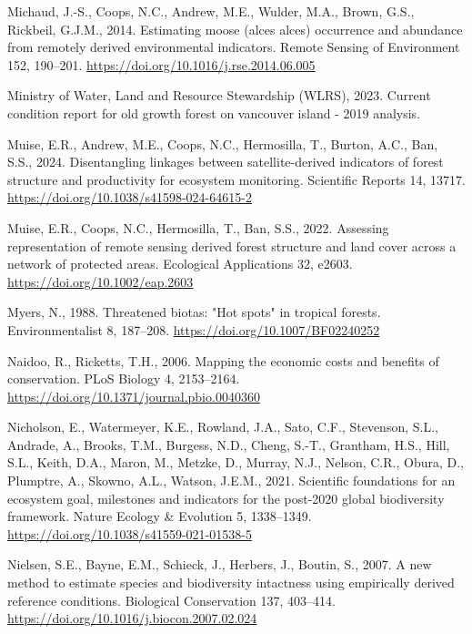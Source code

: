 \documentclass[
]{agujournal2019}
\newlength{\cslhangindent}
\newenvironment{CSLReferences}[2] %
 {\begin{list}{}{%
  \setlength{\itemindent}{0pt}
  \setlength{\leftmargin}{0pt}
  \setlength{\parsep}{0pt}
  \ifodd #1
   \setlength{\leftmargin}{\cslhangindent}
   \setlength{\itemindent}{-1\cslhangindent}
  \fi
  \setlength{\itemsep}{#2\baselineskip}}}
 {\end{list}}
\begin{document}
\begin{CSLReferences}{1}{0}
Michaud, J.-S., Coops, N.C., Andrew, M.E., Wulder, M.A., Brown, G.S.,
Rickbeil, G.J.M., 2014. Estimating moose (alces alces) occurrence and
abundance from remotely derived environmental indicators. Remote Sensing
of Environment 152, 190--201.
\url{https://doi.org/10.1016/j.rse.2014.06.005}

Ministry of Water, Land and Resource Stewardship (WLRS), 2023. Current
condition report for old growth forest on vancouver island - 2019
analysis.

Muise, E.R., Andrew, M.E., Coops, N.C., Hermosilla, T., Burton, A.C.,
Ban, S.S., 2024. Disentangling linkages between satellite-derived
indicators of forest structure and productivity for ecosystem
monitoring. Scientific Reports 14, 13717.
\url{https://doi.org/10.1038/s41598-024-64615-2}

Muise, E.R., Coops, N.C., Hermosilla, T., Ban, S.S., 2022. Assessing
representation of remote sensing derived forest structure and land cover
across a network of protected areas. Ecological Applications 32, e2603.
\url{https://doi.org/10.1002/eap.2603}

Myers, N., 1988. Threatened biotas: {"}Hot spots{"} in tropical forests.
Environmentalist 8, 187--208. \url{https://doi.org/10.1007/BF02240252}

Naidoo, R., Ricketts, T.H., 2006. Mapping the economic costs and
benefits of conservation. PLoS Biology 4, 2153--2164.
\url{https://doi.org/10.1371/journal.pbio.0040360}

Nicholson, E., Watermeyer, K.E., Rowland, J.A., Sato, C.F., Stevenson,
S.L., Andrade, A., Brooks, T.M., Burgess, N.D., Cheng, S.-T., Grantham,
H.S., Hill, S.L., Keith, D.A., Maron, M., Metzke, D., Murray, N.J.,
Nelson, C.R., Obura, D., Plumptre, A., Skowno, A.L., Watson, J.E.M.,
2021. Scientific foundations for an ecosystem goal, milestones and
indicators for the post-2020 global biodiversity framework. Nature
Ecology \& Evolution 5, 1338--1349.
\url{https://doi.org/10.1038/s41559-021-01538-5}

Nielsen, S.E., Bayne, E.M., Schieck, J., Herbers, J., Boutin, S., 2007.
A new method to estimate species and biodiversity intactness using
empirically derived reference conditions. Biological Conservation 137,
403--414. \url{https://doi.org/10.1016/j.biocon.2007.02.024}


\end{CSLReferences}
\end{document}
